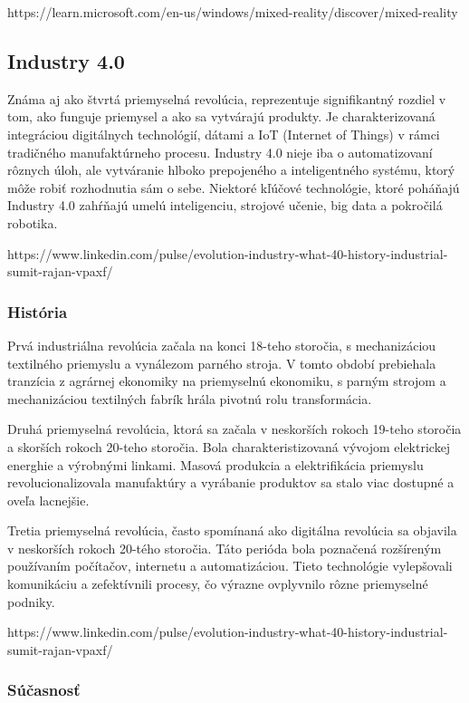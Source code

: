 https://learn.microsoft.com/en-us/windows/mixed-reality/discover/mixed-reality

\subsection{Industry 4.0}

Známa aj ako štvrtá priemyselná revolúcia, reprezentuje signifikantný rozdiel v tom, ako funguje priemysel a ako sa vytvárajú produkty. Je charakterizovaná integráciou digitálnych technológií, dátami a IoT (Internet of Things) v rámci tradičného manufaktúrneho procesu. Industry 4.0 nieje iba o automatizovaní rôznych úloh, ale vytváranie hlboko prepojeného a inteligentného systému, ktorý môže robiť rozhodnutia sám o sebe. Niektoré kľúčové technológie, ktoré poháňajú Industry 4.0 zahŕňajú umelú inteligenciu, strojové učenie, big data a pokročilá robotika.

https://www.linkedin.com/pulse/evolution-industry-what-40-history-industrial-sumit-rajan-vpaxf/

\subsubsection{História}

Prvá industriálna revolúcia začala na konci 18-teho storočia, s mechanizáciou textilného priemyslu a vynálezom parného stroja. V tomto období prebiehala tranzícia z agrárnej ekonomiky na priemyselnú ekonomiku, s parným strojom a mechanizáciou textilných fabrík hrála pivotnú rolu transformácia.

Druhá priemyselná revolúcia, ktorá sa začala v neskorších rokoch 19-teho storočia a skorších rokoch 20-teho storočia. Bola charakteristizovaná vývojom elektrickej energhie a výrobnými linkami. Masová produkcia a elektrifikácia priemyslu revolucionalizovala manufaktúry a vyrábanie produktov sa stalo viac dostupné a oveľa lacnejšie.

Tretia priemyselná revolúcia, často spomínaná ako digitálna revolúcia sa objavila v neskorších rokoch 20-tého storočia. Táto perióda bola poznačená rozšíreným používaním počítačov, internetu a automatizáciou. Tieto technológie vylepšovali komunikáciu a zefektívnili procesy, čo výrazne ovplyvnilo rôzne priemyselné podniky.

https://www.linkedin.com/pulse/evolution-industry-what-40-history-industrial-sumit-rajan-vpaxf/

\subsubsection{Súčasnosť}


